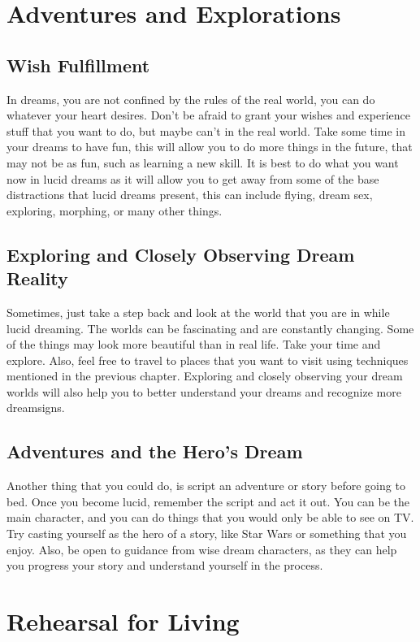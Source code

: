 \documentclass{book}
\begin{document}
\chapter{Adventures and Explorations}

\section{Wish Fulfillment}
In dreams, you are not confined by the rules of the real world, you can do whatever your heart desires. Don't be afraid to grant your wishes and experience stuff that you want to do, but maybe can't in the real world. Take some time in your dreams to have fun, this will allow you to do more things in the future, that may not be as fun, such as learning a new skill. It is best to do what you want now in lucid dreams as it will allow you to get away from some of the base distractions that lucid dreams present, this can include flying, dream sex, exploring, morphing, or many other things.

\section{Exploring and Closely Observing Dream Reality}
Sometimes, just take a step back and look at the world that you are in while lucid dreaming. The worlds can be fascinating and are constantly changing. Some of the things may look more beautiful than in real life. Take your time and explore. Also, feel free to travel to places that you want to visit using techniques mentioned in the previous chapter. Exploring and closely observing your dream worlds will also help you to better understand your dreams and recognize more dreamsigns. 

\section{Adventures and the Hero's Dream}
Another thing that you could do, is script an adventure or story before going to bed. Once you become lucid, remember the script and act it out. You can be the main character, and you can do things that you would only be able to see on TV. Try casting yourself as the hero of a story, like Star Wars or something that you enjoy. Also, be open to guidance from wise dream characters, as they can help you progress your story and understand yourself in the process.

\chapter{Rehearsal for Living}
\end{document}
